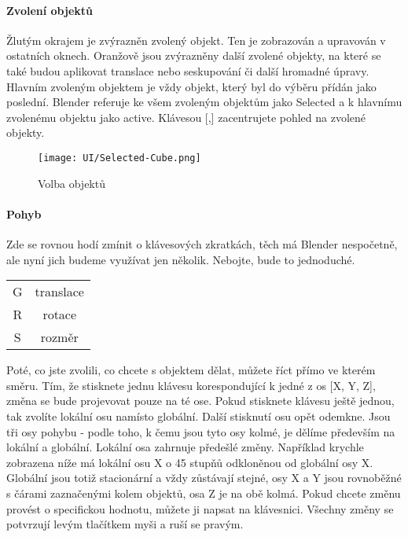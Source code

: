 \documentclass[12pt,a4paper]{report}
\begin{document}
	\paragraph{Zvolení objektů} Žlutým okrajem je zvýrazněn zvolený objekt. Ten je
	zobrazován a upravován v ostatních oknech. Oranžově jsou zvýrazněny
	další zvolené objekty, na které se také budou aplikovat translace nebo
	seskupování či další hromadné úpravy. Hlavním zvoleným objektem je
	vždy objekt, který byl do výběru přídán jako poslední. Blender referuje ke
	všem zvoleným objektům jako Selected a k hlavnímu zvolenému objektu
	jako active. Klávesou [,] zacentrujete pohled na zvolené objekty.
	
	\begin{figure}[h]
		\centering
		\texttt{[image: UI/Selected-Cube.png]}
		\caption{Volba objektů}
		\label{pic:cube-selection}
	\end{figure}

	\paragraph{Pohyb} Zde se rovnou hodí zmínit o klávesových zkratkách, těch má
Blender nespočetně, ale nyní jich budeme využívat jen několik. Nebojte,
bude to jednoduché.
	\newline \newline

	\begin{tabular}{cc}
		G & translace \\
		R & rotace \\
		S & rozměr
	\end{tabular}
	
	Poté, co jste zvolili, co chcete s objektem dělat, můžete říct přímo
	ve kterém směru. Tím, že stisknete jednu klávesu korespondující k jedné
	z os [X, Y, Z], změna se bude projevovat pouze na té ose. Pokud
	stisknete klávesu ještě jednou, tak zvolíte lokální osu namísto
	globální. Další stisknutí osu opět odemkne.
	Jsou tři osy pohybu - podle toho, k čemu jsou tyto osy kolmé, je dělíme
	především na lokální a globální. Lokální osa zahrnuje předešlé změny.
	Například krychle zobrazena níže má lokální osu X o 45 stupňů
	odkloněnou od globální osy X. Globální jsou totiž stacionární a vždy
	zůstávají stejné, osy X a Y jsou rovnoběžné s čárami zaznačenými kolem
	objektů, osa Z je na obě kolmá.
	Pokud chcete změnu provést o specifickou hodnotu, můžete ji napsat na
	klávesnici. Všechny změny se potvrzují levým tlačítkem myši a ruší se
	pravým.

	
\end{document}
